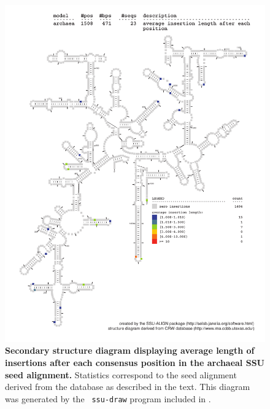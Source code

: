 \begin{figure}
\begin{center}
\includegraphics[width=5.7in]{Figures/archaea-0p1-iavglen}
\end{center}
\caption[Secondary structure diagram displaying average length of insertions
  after each consensus position in the archaeal SSU seed
  alignment]{\textbf{Secondary structure diagram displaying average
    length of insertions after each consensus position in the archaeal SSU seed
  alignment.} Statistics correspond to the  seed
  alignment derived from the  database \cite{CannoneGutell02}
  as described in the text. This diagram was generated by the {\tt
  ssu-draw} program included in .}
\label{fig:arciavglen}
\end{figure}


